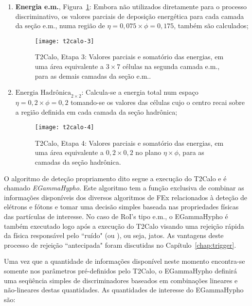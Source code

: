 \begin{enumerate}
\item \textbf{Energia e.m.}, Figura~\ref{fig:t2calo-3}: Embora não utilizados
diretamente para o processo discriminativo, os valores parciais de deposição
energética para cada camada da seção e.m., numa região de $\eta=0,075 \times
\phi=0,175$, também são calculados;

\begin{figure}
\begin{center}
\texttt{[image: t2calo-3]}
\end{center}
\caption{T2Calo, Etapa 3: Valores parciais e somatório das energias, em uma
área equivalente a $3\times7$ células na segunda camada e.m., para as demais
camadas da seção e.m..}
\label{fig:t2calo-3}
\end{figure}

\item \textbf{$\text{Energia Hadrônica}_{2 \times 2}$}: Calcula-se a energia
total num espaço $\eta=0,2 \times \phi=0,2$ tomando-se os valores das células
cujo o centro recai sobre a região definida em cada camada da seção hadrônica;

\begin{figure}
\begin{center}
\texttt{[image: t2calo-4]}
\end{center}
\caption{T2Calo, Etapa 4: Valores parciais e somatório das energias, em uma
área equivalente a $0,2\times0,2$ no plano $\eta\times\phi$, para as camadas
da seção hadrônica.} 
\label{fig:t2calo-4}
\end{figure}

\end{enumerate}

O algoritmo de deteção propriamento dito segue a execução do T2Calo e é
chamado \emph{EGammaHypho}. Este algoritmo tem a função exclusiva de combinar
as informações disponíveis dos diversos algoritmos de FEx relacionados à
deteção de elétrons e fótons e tomar uma decisão simples baseada nas
propriedades físicas das partículas de interesse. No caso de RoI's tipo e.m.,
o EGammaHypho é também executado logo após a execução do T2Calo visando uma
rejeição rápida da física responsável pelo ``ruído" (ou ), ou
seja, jatos. As vantagens deste processo de rejeição ``antecipada" foram
discutidas no Capítulo~\ref{chap:trigger}.

Uma vez que a quantidade de informações disponível neste momento encontra-se
somente nos parâmetros pré-definidos pelo T2Calo, o EGammaHypho definirá uma
seqüência simples de discriminadores baseados em combinações lineares e
não-lineares destas quantidades. As quantidades de interesse do EGammaHypho
são: 

